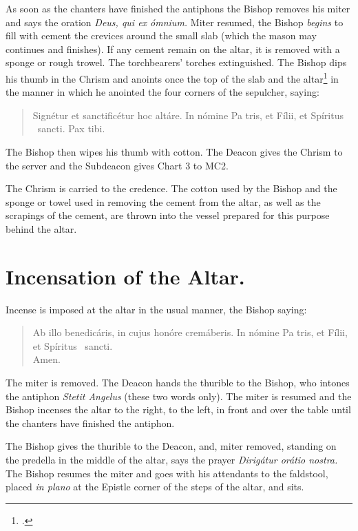 \documentclass[letterpaper]{report}
\newcommand\blessincense{
\begin{quote}
   Ab illo benedicáris, in cujus honóre cremáberis. In nómine Pa\cross
    tris, et Fí\cross lii, et Spíritus \cross\ sancti. \\ \rbar Amen.
\end{quote}
}
\begin{document}
{    \rubric As soon as the chanters have finished the antiphons the Bishop
    removes his miter and says the oration \textit{Deus, qui ex ómnium.} Miter
    resumed, the Bishop \textit{begins} to fill with cement the crevices around
    the small slab (which the mason may continues and finishes). If any cement
    remain on the altar, it is removed with a sponge or rough
    trowel. The torchbearers' torches extinguished. The Bishop dips his
    thumb in the Chrism and anoints once the top of the slab and the
    altar\footcite[Martinucci, Hartmann, Moretti, etc., say that the cross
    should be made not only on the slab, but also on the portions of the table
    of the altar near the slab.][footnote 1, p. 90.]{consecranda} in the manner
    in which he anointed the four corners of the sepulcher, saying:

    \begin{quote}
        Signé\cross tur et sancti\cross ficétur hoc altáre. In nómine Pa\cross
        tris, et Fí\cross lii, et Spíritus \cross\ sancti. Pax tibi.
    \end{quote}

    The Bishop then wipes his thumb with cotton. The Deacon gives the Chrism to the
    server and the Subdeacon gives Chart 3 to MC2.

    The Chrism is carried to the credence. The cotton used by the Bishop and
    the sponge or towel used in removing the cement from the altar, as well as
    the scrapings of the cement, are thrown into the vessel prepared for this
    purpose behind the altar.

    \section{Incensation of the Altar.}

    \rubric Incense is imposed at the altar in the usual manner, the Bishop
    saying:

    \blessincense

    The miter is removed. The Deacon hands the thurible to the Bishop, who
    intones the antiphon \textit{Stetit Angelus} (these two words only). The
    miter is resumed and the Bishop incenses the altar to the right, to the
    left, in front and over the table until the chanters have finished the
    antiphon.

    \rubric The Bishop gives the thurible to the Deacon, and, miter removed,
    standing on the predella in the middle of the altar, says the prayer
    \textit{Dirigátur orátio nostra.} The Bishop resumes the miter and goes
    with his attendants to the faldstool, placed \textit{in plano} at the
    Epistle corner of the steps of the altar, and sits.

}
\end{document}
